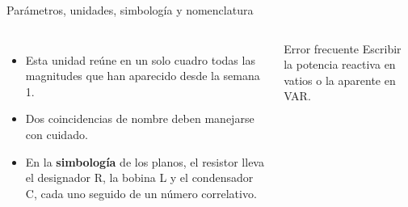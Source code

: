\documentclass[aspectratio=169,11pt,xcolor={table}]{beamer}
\begin{document}
\begin{frame}{Parámetros, unidades, simbología y nomenclatura}
\begin{columns}[c,onlytextwidth]
\small
\begin{itemize}\setlength{\itemsep}{4pt}
  \item Esta unidad reúne en un solo cuadro todas las magnitudes que han aparecido desde la semana 1.
  \item Dos coincidencias de nombre deben manejarse con cuidado.
  \item En la \textbf{simbología} de los planos, el resistor lleva el designador R, la bobina L y el condensador C, cada uno seguido de un número correlativo.
\end{itemize}
\begin{cardO}{Error frecuente}
\footnotesize Escribir la potencia reactiva en vatios o la aparente en VAR.
\end{cardO}
\end{columns}
\end{frame}
\end{document}
